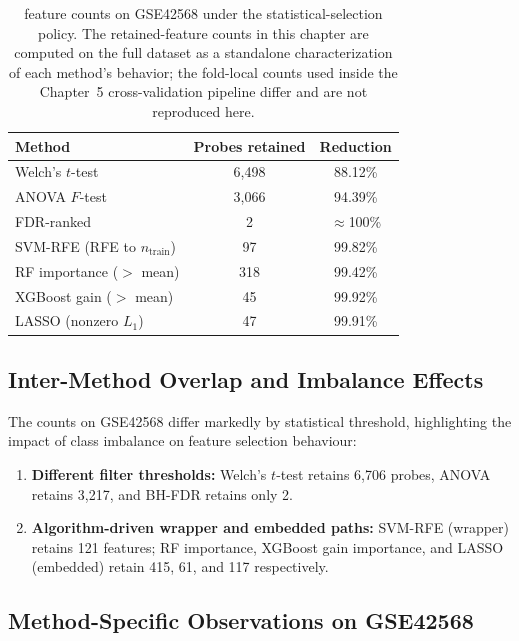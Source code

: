 \begin{table}[H]
\centering
\caption{feature counts on GSE42568 under the statistical-selection policy. The retained-feature counts in this chapter are computed on the full dataset as a standalone characterization of each method's behavior; the fold-local counts used inside the Chapter~5 cross-validation pipeline differ and are not reproduced here.}
\label{tab:gse42568_probes_summary}
\small
\begin{tabular}{lcc}
\toprule
\textbf{Method} & \textbf{Probes retained} & \textbf{Reduction} \\
\midrule
Welch's $t$-test & 6,498 & 88.12\% \\
ANOVA $F$-test & 3,066 & 94.39\% \\
FDR-ranked & 2 & $\approx$100\% \\
SVM-RFE (RFE to $n_{\mathrm{train}}$) & 97 & 99.82\% \\
RF importance ($>$ mean) & 318 & 99.42\% \\
XGBoost gain ($>$ mean) & 45 & 99.92\% \\
LASSO (nonzero $L_1$) & 47 & 99.91\% \\
\bottomrule
\end{tabular}
\end{table}

\subsection{Inter-Method Overlap and Imbalance Effects}

The counts on GSE42568 differ markedly by statistical threshold, highlighting the impact of class imbalance on feature selection behaviour:

\begin{enumerate}
    \item \textbf{Different filter thresholds:} Welch's $t$-test retains 6,706 probes, ANOVA retains 3,217, and BH-FDR retains only 2.

    \item \textbf{Algorithm-driven wrapper and embedded paths:} SVM-RFE (wrapper) retains 121 features; RF importance, XGBoost gain importance, and LASSO (embedded) retain 415, 61, and 117 respectively.
\end{enumerate}

\subsection{Method-Specific Observations on GSE42568}

